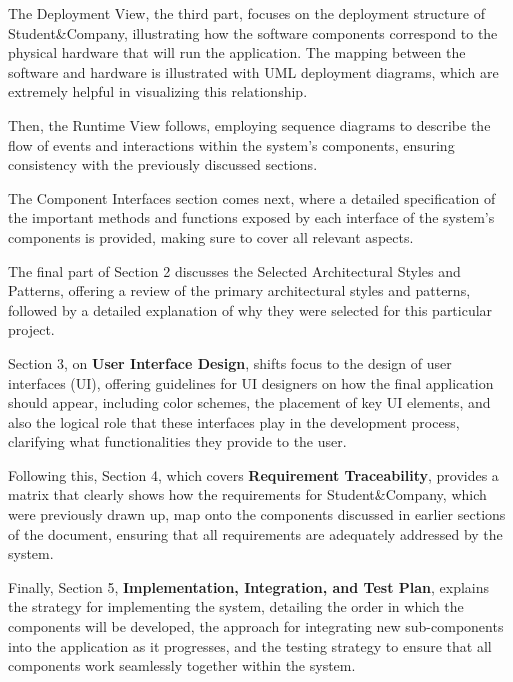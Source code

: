 The Deployment View, the third part, focuses on the deployment structure of
Student\&Company, illustrating how the software components correspond to the physical hardware that will
run the application. The mapping between the software and hardware is illustrated with UML deployment
diagrams, which are extremely helpful in visualizing this relationship.

Then, the Runtime View follows,
employing sequence diagrams to describe the flow of events and interactions within the system’s
components, ensuring consistency with the previously discussed sections.

The Component Interfaces
section comes next, where a detailed specification of the important methods and functions exposed
by each interface of the system’s components is provided, making sure to cover all relevant aspects.

The final part of Section 2 discusses the Selected Architectural Styles and Patterns, offering a
review of the primary architectural styles and patterns, followed by a detailed explanation of why
they were selected for this particular project.

Section 3, on \textbf{User Interface Design}, shifts focus to the design of user interfaces (UI), offering
guidelines for UI designers on how the final application should appear, including color schemes,
the placement of key UI elements, and also the logical role that these interfaces play in the
development process, clarifying what functionalities they provide to the user.

Following this,
Section 4, which covers \textbf{Requirement Traceability}, provides a matrix that clearly shows how the
requirements for Student\&Company, which were previously drawn up, map onto the components discussed
in earlier sections of the document, ensuring that all requirements are adequately addressed by the
system.

Finally, Section 5, \textbf{Implementation, Integration, and Test Plan}, explains the strategy for
implementing the system, detailing the order in which the components will be developed, the
approach for integrating new sub-components into the application as it progresses, and the
testing strategy to ensure that all components work seamlessly together within the system.